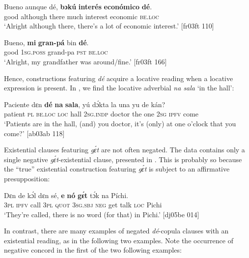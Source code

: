 \ea%
    \label{ex:key:808}
    \gll Bueno  aunque  dé,    \textbf{bɔkú}  \textbf{interés}  \textbf{económico}  \textbf{dé}.\\
good  although  there  much  interest  economic  \textsc{be.loc}\\

\glt ‘Alright although there, there’s a lot of economic interest.’ [fr03ft 110]
\z


\ea%
    \label{ex:key:809}
    \gll Bueno,  \textbf{mi}    \textbf{gran-pá}    bin  \textbf{dé}.\\
good  \textsc{1sg.poss}  grand-pa    \textsc{pst}  \textsc{be.loc}\\

\glt ‘Alright, my grandfather was around/fine.’ [fr03ft 166]
\z

Hence, constructions featuring \textit{dé} acquire a locative reading when a locative expression is present. In , we find the locative adverbial \textit{na sala} ‘in the hall’:


\ea%
    \label{ex:key:810}
    \gll Paciente  dɛn  \textbf{dé}    \textbf{na}  \textbf{sala},  yú    dɔ́kta  la  una
yu  de  kán?\\
patient  \textsc{pl}  \textsc{be.loc}  \textsc{loc}  hall    \textsc{2sg.indp}  doctor  the  one
\textsc{2sg}  \textsc{ipfv}  come\\

\glt ‘Patients are in the hall, (and) you doctor, it’s (only)
at one o’clock that you come?’ [ab03ab 118]
\z

Existential clauses featuring \textit{gɛ́t} are not often negated. The data contains only a single negative \textit{gɛ́t}-existential clause, presented in . This is probably so because the “true” existential construction featuring \textit{gɛ́t} is subject to an affirmative presupposition:


\ea%
    \label{ex:key:811}
    \gll Dɛn  de  kɔ́l  dɛn  sé,    \textbf{e}    \textbf{nó}  \textbf{gɛ́t} tɔ́k  na  Píchi.\\
\textsc{3pl}  \textsc{ipfv}  call  \textsc{3pl}  \textsc{quot}    \textsc{3sg.sbj}  \textsc{neg}  get talk  \textsc{loc}  Pichi\\

\glt ‘They’re called, there is no word (for that) in Pichi.’ [dj05be 014]
\z

In contrast, there are many examples of negated \textit{dé}{}-copula clauses with an existential reading, as in the following two examples. Note the occurrence of negative concord in the first of the two following examples: 


